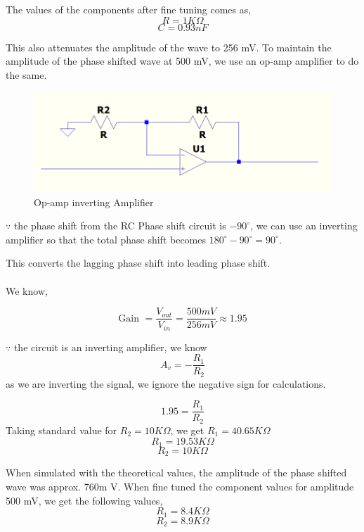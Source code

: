 The values of the components after fine tuning comes as,
$$R = 1K\Omega$$
$$C = 0.93nF$$

This also attenuates the amplitude of the wave to 256 mV.
To maintain the amplitude of the phase shifted wave at 500 mV, we use an op-amp amplifier to do the same.
\begin{figure}[H]
    \centering
    \includegraphics[width=0.75\linewidth]{op-amp-amplifier.png}
    \caption{Op-amp inverting Amplifier}
    \label{fig:op-amp-amp}
\end{figure}

$\because$ the phase shift from the RC Phase shift circuit is $-90^\circ$, we can use an inverting amplifier so that the total phase shift becomes $180^\circ - 90^\circ = 90^\circ$.

This converts the lagging phase shift into leading phase shift.\\
\\
We know,

$$\text{Gain } = \frac{V_{out}}{V_{in}} = \frac{500mV}{256mV} \approx 1.95$$

$\because$ the circuit is an inverting amplifier, we know
$$A_v = -\frac{R_1}{R_2}$$
as we are inverting the signal, we ignore the negative sign for calculations.

$$1.95 = \frac{R_1}{R_2}$$
Taking standard value for $R_2 = 10K\Omega$, we get $R_1 = 40.65K\Omega$
$$R_1 = 19.53K\Omega$$
$$R_2 = 10K\Omega$$

When simulated with the theoretical values, the amplitude of the phase shifted wave was approx. 760m V. When fine tuned the component values for amplitude 500 mV, we get the following values,
$$R_1 = 8.4K\Omega$$
$$R_2 = 8.9K\Omega$$

